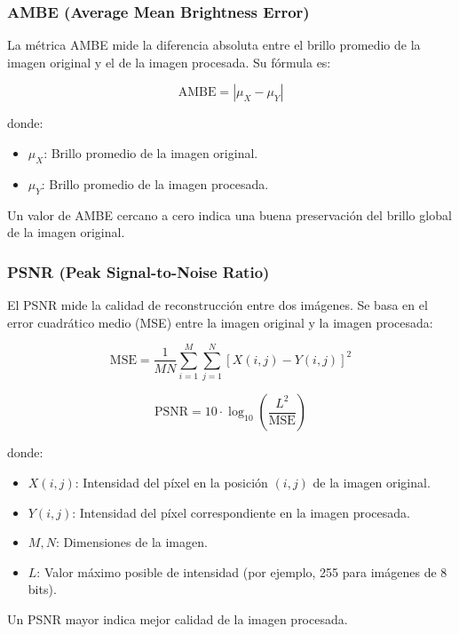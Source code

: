 \documentclass[sigchi]{acmart}
\begin{document}
\subsubsection{\textbf{AMBE (Average Mean Brightness Error)}}
La métrica AMBE mide la diferencia absoluta entre el brillo promedio de la imagen original y el
de la imagen procesada. Su fórmula es:

\begin{equation}
	\text{AMBE} = \left| \mu_X - \mu_Y \right|
\end{equation}

donde:
\begin{itemize}
	\item $\mu_X$: Brillo promedio de la imagen original.
	\item $\mu_Y$: Brillo promedio de la imagen procesada.
\end{itemize}

Un valor de AMBE cercano a cero indica una buena preservación del brillo global de la imagen original.

\subsubsection{\textbf{PSNR (Peak Signal-to-Noise Ratio)}}
El PSNR mide la calidad de reconstrucción entre dos imágenes. Se basa en el error cuadrático
medio (MSE) entre la imagen original y la imagen procesada:

\begin{equation}
	\text{MSE} = \frac{1}{MN} \sum_{i=1}^{M} \sum_{j=1}^{N} \left[ X(i,j) - Y(i,j) \right]^2
\end{equation}

\begin{equation}
	\text{PSNR} = 10 \cdot \log_{10} \left( \frac{L^2}{\text{MSE}} \right)
\end{equation}

donde:
\begin{itemize}
	\item $X(i,j)$: Intensidad del píxel en la posición $(i,j)$ de la imagen original.
	\item $Y(i,j)$: Intensidad del píxel correspondiente en la imagen procesada.
	\item $M, N$: Dimensiones de la imagen.
	\item $L$: Valor máximo posible de intensidad (por ejemplo, 255 para imágenes de 8 bits).
\end{itemize}

Un PSNR mayor indica mejor calidad de la imagen procesada.
\end{document}

